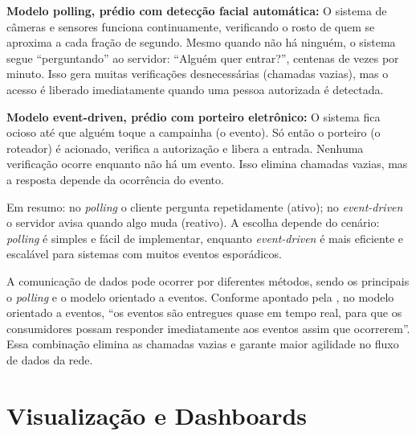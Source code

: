 \documentclass[
    12pt
    ,oneside
    ,a4paper
    ,chapter=TITLE
    ,section=TITLE
    ,sumario=abnt-6027-2012]{abntex2}
\begin{document}
\textbf{Modelo polling, prédio com detecção facial automática:} O sistema de câmeras e sensores funciona continuamente, verificando o rosto de quem se aproxima a cada fração de segundo. Mesmo quando não há ninguém, o sistema segue “perguntando” ao servidor: “Alguém quer entrar?”, centenas de vezes por minuto. Isso gera muitas verificações desnecessárias (chamadas vazias), mas o acesso é liberado imediatamente quando uma pessoa autorizada é detectada.

\textbf{Modelo event-driven, prédio com porteiro eletrônico:} O sistema fica ocioso até que alguém toque a campainha (o evento). Só então o porteiro (o roteador) é acionado, verifica a autorização e libera a entrada. Nenhuma verificação ocorre enquanto não há um evento. Isso elimina chamadas vazias, mas a resposta depende da ocorrência do evento.

Em resumo: no \textit{polling} o cliente pergunta repetidamente (ativo); no \textit{event-driven} o servidor avisa quando algo muda (reativo). A escolha depende do cenário: \textit{polling} é simples e fácil de implementar, enquanto \textit{event-driven} é mais eficiente e escalável para sistemas com muitos eventos esporádicos.

A comunicação de dados pode ocorrer por diferentes métodos, sendo os principais o \textit{polling} e o modelo orientado a eventos. Conforme apontado pela , no modelo orientado a eventos, “os eventos são entregues quase em tempo real, para que os consumidores possam responder imediatamente aos eventos assim que ocorrerem”. Essa combinação elimina as chamadas vazias e garante maior agilidade no fluxo de dados da rede.



\chapter{Visualização e Dashboards}
\label{cap:dash}
\end{document}
